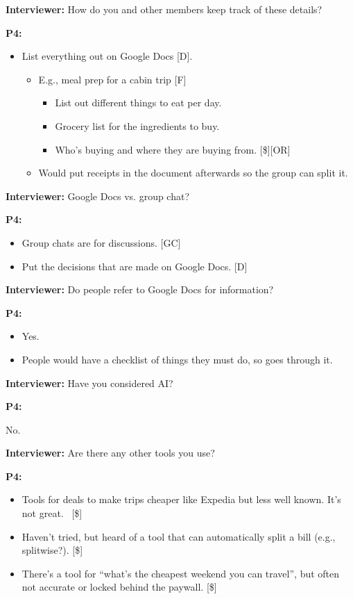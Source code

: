 \documentclass[12pt,a4paper]{article}
\begin{document}
\textbf{Interviewer: }How do you and other members keep track of these details? 

\textbf{P4:}

\begin{itemize}
    \item List everything out on Google Docs [D]. 
    \begin{itemize}
        \item E.g., meal prep for a cabin trip [F]
        \begin{itemize}
            \item List out different things to eat per day. 
            \item Grocery list for the ingredients to buy.
            \item Who’s buying and where they are buying from. [\$][OR]
        \end{itemize}
        \item Would put receipts in the document afterwards so the group can split it. 
    \end{itemize}
\end{itemize}

\textbf{Interviewer: }Google Docs vs. group chat? 

\textbf{P4:}

\begin{itemize}
    \item Group chats are for discussions. [GC]
    \item Put the decisions that are made on Google Docs. [D] 
\end{itemize}

\textbf{Interviewer: }Do people refer to Google Docs for information? 

\textbf{P4:}

\begin{itemize}
    \item Yes. 
    \item People would have a checklist of things they must do, so goes through it. 
\end{itemize}

\textbf{Interviewer: }Have you considered AI? 

\textbf{P4:}

No.

\textbf{Interviewer: }Are there any other tools you use? 

\textbf{P4:}

\begin{itemize}
    \item Tools for deals to make trips cheaper like Expedia but less well known.
It’s not great.  [\$]

    \item Haven’t tried, but heard of a tool that can automatically split a bill (e.g., splitwise?). [\$] 
    \item There’s a tool for “what’s the cheapest weekend you can travel”, but often not accurate or locked behind the paywall. [\$]
\end{itemize}
\end{document}
